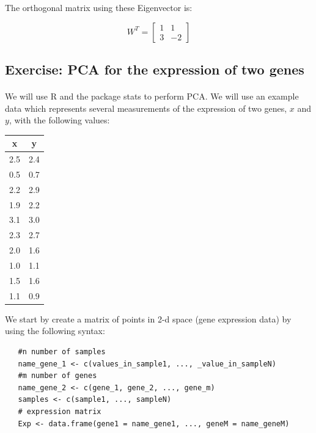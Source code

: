 \documentclass[11pt, oneside]{article}   	%
\begin{document}
The orthogonal matrix using these Eigenvector is: 

\[ 
  W^T = 
   \left[ \begin{array}{cc}
      1 & 1 \\ 
      3 & -2      
   \end{array} \right]
\]




\subsection{Exercise: PCA for the expression of two genes}
\paragraph{}

We will use R and the package stats to perform PCA. We will use an example data which represents several measurements of the expression of two genes, $x$ and $y$, with the following values:

\begin{center}
\begin{tabular}{c|c}
   x & y \\
   \hline
   2.5 & 2.4\\
   0.5 & 0.7\\
   2.2 & 2.9\\
   1.9 & 2.2\\
   3.1 & 3.0\\
   2.3 & 2.7\\
   2.0 & 1.6\\
   1.0 & 1.1\\
   1.5 & 1.6\\
   1.1 & 0.9\\
   \hline
\end{tabular}
\end{center}
   

We start by create a matrix of points in 2-d space (gene expression data) by using the following syntax:

	
\begin{framed}
\begin{verbatim}
   #n number of samples
   name_gene_1 <- c(values_in_sample1, ..., _value_in_sampleN) 
   #m number of genes
   name_gene_2 <- c(gene_1, gene_2, ..., gene_m)    
   samples <- c(sample1, ..., sampleN)
   # expression matrix
   Exp <- data.frame(gene1 = name_gene1, ..., geneM = name_geneM)	
\end{verbatim}
\end{framed}
\end{document}
